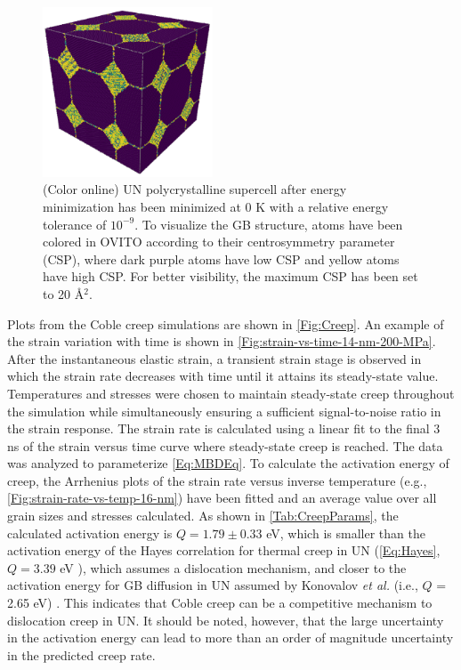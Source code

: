 \documentclass[preprint,12pt,sort&compress]{elsarticle} %
\newcommand{\?}{\stackrel{?}{=}}
\providecommand{\DIFaddtex}[1]{{\sf #1}} %
\providecommand{\DIFaddbegin}{\protect\color{blue}} %
\providecommand{\DIFaddend}{\protect\color{black}} %
\providecommand{\DIFadd}[1]{\texorpdfstring{\DIFaddtex{#1}}{#1}} %
\newcommand{\DIFaddincludegraphics}[2][]{{\color{blue}\fbox{\DIFOincludegraphics[#1]{#2}}}} %
\DeclareRobustCommand{\DIFaddbegin}{\DIFOaddbegin \let\includegraphics\DIFaddincludegraphics} %
\DeclareRobustCommand{\DIFaddend}{\DIFOaddend \let\includegraphics\DIFOincludegraphics} %
\begin{document}
\begin{figure}[h]
    \centering
    \includegraphics[width=0.45\textwidth]{Structure.png}
    \caption{(Color online) UN polycrystalline supercell after energy minimization has been minimized at 0 K with a relative energy tolerance of $10^{-9}$. To visualize the GB structure, atoms have been colored in OVITO according to their centrosymmetry parameter (CSP), where dark purple atoms have low CSP and yellow atoms have high CSP. For better visibility, the maximum CSP has been set to 20 \AA$^{2}$.}
    \label{Fig:Structure}
\end{figure}

Plots from the Coble creep simulations are shown in \cref{Fig:Creep}. An example of the strain variation with time is shown in \cref{Fig:strain-vs-time-14-nm-200-MPa}. After the instantaneous elastic strain, a transient strain stage is observed in which the strain rate decreases with time until it attains its steady-state value. Temperatures and stresses were chosen to maintain steady-state creep throughout the simulation while simultaneously ensuring a sufficient signal-to-noise ratio in the strain response. The strain rate is calculated using a linear fit to the final 3 ns of the strain versus time curve where steady-state creep is reached. The data was analyzed to parameterize \cref{Eq:MBDEq}. To calculate the activation energy of creep, the Arrhenius plots of the strain rate versus inverse temperature (e.g., \cref{Fig:strain-rate-vs-temp-16-nm}) have been fitted and an average value over all grain sizes and stresses calculated. As shown in \cref{Tab:CreepParams}, the calculated activation energy is $Q = 1.79 \pm 0.33$ eV, which is smaller than the activation energy of the Hayes correlation for thermal creep in UN (\cref{Eq:Hayes}, $Q = 3.39$ eV \cite{Hayes1990II}), which assumes a dislocation mechanism, and closer to the activation energy for GB diffusion in UN assumed by Konovalov \textit{et al.} (i.e., $Q$ = 2.65 eV) \cite{Konovalov2016}. This indicates that Coble creep can be a competitive mechanism to dislocation creep in UN. \DIFaddbegin \DIFadd{It should be noted, however, that the large uncertainty in the activation energy can lead to more than an order of magnitude uncertainty in the predicted creep rate.
}\DIFaddend 
\end{document}
